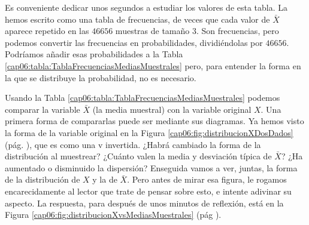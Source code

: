 \begin{ejemplo}
    Es conveniente dedicar unos segundos a estudiar los valores de esta tabla. La hemos escrito como una tabla de frecuencias, de veces que cada valor de $\bar X$ aparece repetido en las $46656$ muestras de tamaño $3$. Son frecuencias, pero podemos convertir las frecuencias en probabilidades, dividiéndolas por $46656$. Podríamos añadir esas probabilidades a la Tabla \ref{cap06:tabla:TablaFrecuenciasMediasMuestrales} pero, para entender la forma en la que se distribuye la probabilidad, no es necesario.

    Usando la Tabla \ref{cap06:tabla:TablaFrecuenciasMediasMuestrales} podemos comparar la variable $\bar X$ (la media muestral) con la variable original $X$. Una  primera forma de compararlas puede ser mediante sus diagramas. Ya hemos visto la forma de la variable original en la Figura \ref{cap06:fig:distribucionXDosDados} (pág. \pageref{cap06:fig:distribucionXDosDados}), que es como una v invertida.  ¿Habrá cambiado la forma de la distribución al muestrear? ¿Cuánto valen la media y desviación típica de $\bar X$? ¿Ha aumentado o disminuido la dispersión?
    Enseguida vamos a ver, juntas,  la forma de la distribución de $X$ y la de $\bar X$. Pero antes de mirar esa figura, le rogamos encarecidamente al lector que trate de pensar sobre esto, e intente adivinar su aspecto. La respuesta, para después de unos minutos de reflexión, está en la Figura \ref{cap06:fig:distribucionXvsMediasMuestrales} (pág \pageref{cap06:fig:distribucionXvsMediasMuestrales}).


\end{ejemplo}
